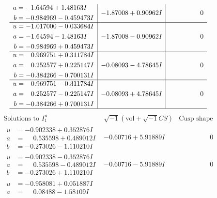 \documentclass[1p]{elsarticle_modified}
\theoremstyle{definition}
\newcommand{\I}{\sqrt{-1}}
\begin{document}
$$\begin{array}{c|c|c}
\begin{aligned}
a &= -1.64594 + 1.48163 I \\
b &= -0.984969 - 0.459473 I\end{aligned}
 & -1.87008 + 0.90962 I & \phantom{-0.000000 } 0 \\ \hline\begin{aligned}
u &= -1.017000 - 0.033684 I \\
a &= -1.64594 - 1.48163 I \\
b &= -0.984969 + 0.459473 I\end{aligned}
 & -1.87008 - 0.90962 I & \phantom{-0.000000 } 0 \\ \hline\begin{aligned}
u &= \phantom{-}0.969751 + 0.311784 I \\
a &= \phantom{-}0.252577 + 0.225147 I \\
b &= -0.384266 - 0.700131 I\end{aligned}
 & -0.08093 - 4.78645 I & \phantom{-0.000000 } 0 \\ \hline\begin{aligned}
u &= \phantom{-}0.969751 - 0.311784 I \\
a &= \phantom{-}0.252577 - 0.225147 I \\
b &= -0.384266 + 0.700131 I\end{aligned}
 & -0.08093 + 4.78645 I & \phantom{-0.000000 } 0\\
 \hline 
 \end{array}$$\newpage$$\begin{array}{c|c|c}  
\text{Solutions to }I^u_{1}& \I (\text{vol} + \sqrt{-1}CS) & \text{Cusp shape}\\
 \hline 
\begin{aligned}
u &= -0.902338 + 0.352876 I \\
a &= \phantom{-}0.535598 + 0.489012 I \\
b &= -0.273026 - 1.110210 I\end{aligned}
 & -0.60716 + 5.91889 I & \phantom{-0.000000 } 0 \\ \hline\begin{aligned}
u &= -0.902338 - 0.352876 I \\
a &= \phantom{-}0.535598 - 0.489012 I \\
b &= -0.273026 + 1.110210 I\end{aligned}
 & -0.60716 - 5.91889 I & \phantom{-0.000000 } 0 \\ \hline\begin{aligned}
u &= -0.958081 + 0.051887 I \\
a &= \phantom{-}0.08488 - 1.58109 I \\

\end{aligned}
\end{array}$$
\end{document}
